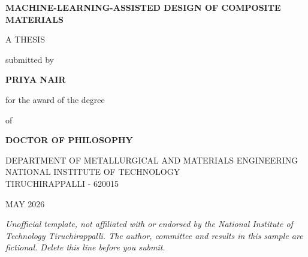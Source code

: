 \begin{titlepage}
\centering
\begin{singlespace}
\vspace*{0.5in}
{\large\bfseries\MakeUppercase{Machine-Learning-Assisted Design of Composite Materials}\par}
\vspace{0.8in}
A THESIS\par\vspace{0.1in}
submitted by\par\vspace{0.2in}
{\fontsize{14}{17}\selectfont\bfseries\MakeUppercase{Priya Nair}\par}
\vspace{0.3in}
for the award of the degree\par\vspace{0.1in}
of\par\vspace{0.1in}
{\fontsize{14}{17}\selectfont\bfseries DOCTOR OF PHILOSOPHY\par}
\vspace{1in}
\MakeUppercase{Department of Metallurgical and Materials Engineering}\\
NATIONAL INSTITUTE OF TECHNOLOGY\\
TIRUCHIRAPPALLI - 620015\par\vspace{0.3in}
\MakeUppercase{May 2026}
\end{singlespace}
\vfill
{\footnotesize\itshape Unofficial template, not affiliated with or endorsed by the National Institute of Technology Tiruchirappalli. The author, committee and results in this sample are fictional. Delete this line before you submit.}
\end{titlepage}


